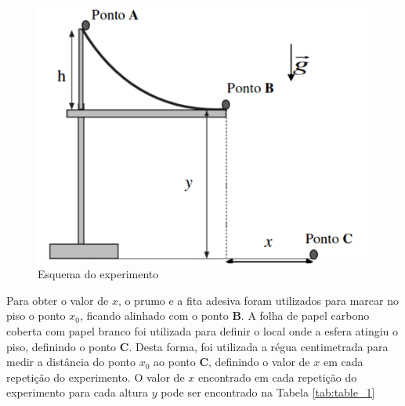 \documentclass[10pt]{article}
\begin{document}
\begin{figure}
	\begin{center}
		\includegraphics[scale=0.5]{lancamento_horizontal.png}
		\caption{Esquema do experimento}
		\label{fig:lancamento}
	\end{center}
\end{figure}

Para obter o valor de $x$, o prumo e a fita adesiva foram utilizados para marcar no piso o ponto $x_0$, ficando alinhado com o ponto \textbf{B}. A folha de papel carbono coberta com papel branco foi utilizada para definir o local onde a esfera atingiu o piso, definindo o ponto \textbf{C}. Desta forma, foi utilizada a régua centimetrada para medir a distância do ponto $x_0$ ao ponto \textbf{C}, definindo o valor de $x$ em cada repetição do experimento. O valor de $x$ encontrado em cada repetição do experimento para cada altura $y$ pode ser encontrado na Tabela \ref{tab:table_1}


\begin{table}[h!]
	\begin{center}
		\caption{Resultados obtidos em cada repetição do experimento}
		\label{tab:table_1}
	\end{center}
\end{table}
\end{document}
